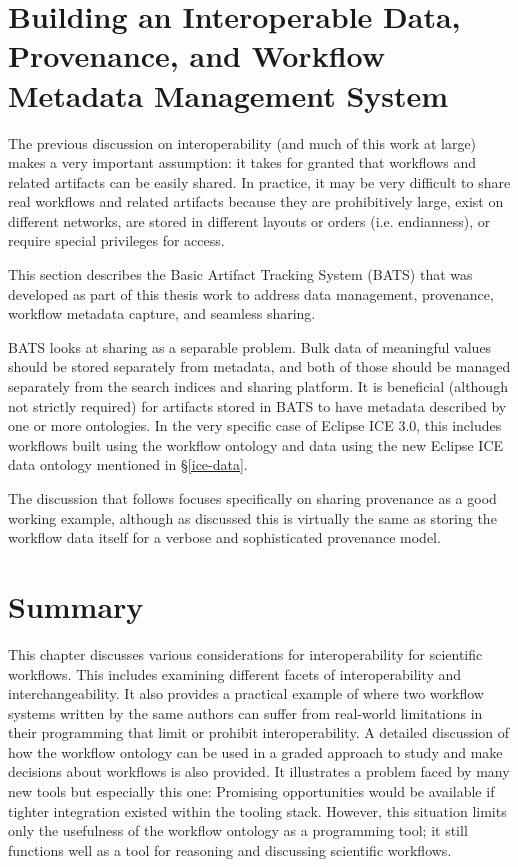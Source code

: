 \section{Building an Interoperable Data, Provenance, and Workflow Metadata
Management System}

The previous discussion on interoperability (and much of this work at
large) makes a very important assumption: it takes for granted that workflows
and related artifacts can be easily shared. In practice, it may be very
difficult to share real workflows and related artifacts because they are
prohibitively large, exist on different networks, are stored in different
layouts or orders (i.e. endianness), or require special privileges for access.

This section describes the Basic Artifact Tracking System (BATS) that
was developed as part of this thesis work to address data management,
provenance, workflow metadata capture, and seamless sharing.

BATS looks at sharing as a separable problem. Bulk data of meaningful values
should be stored separately from metadata, and both of those should be managed
separately from the search indices and sharing platform. It is beneficial
(although not strictly required) for artifacts stored in BATS to have metadata
described by one or more ontologies. In the very specific case of Eclipse ICE
3.0, this includes workflows built using the workflow ontology and data using
the new Eclipse ICE data ontology mentioned in \S \ref{ice-data}.

The discussion that follows focuses specifically on sharing provenance as a good
working example, although as discussed this is virtually the same as
storing the workflow data itself for a verbose and sophisticated provenance
model.


\section{Summary}

This chapter discusses various considerations for interoperability for
scientific workflows. This includes examining different facets of
interoperability and interchangeability. It also provides a practical example of
where two workflow systems written by the same authors can suffer from
real-world limitations in their programming that limit or prohibit
interoperability. A detailed discussion of how the workflow ontology can be used
in a graded approach to study and make decisions about workflows is also provided.
It illustrates a problem faced by many new tools but especially this one:
Promising opportunities would be available if tighter integration existed
within the tooling stack. However, this situation limits only the usefulness of
the workflow ontology as a programming tool; it still functions well as a tool
for reasoning and discussing scientific workflows.

